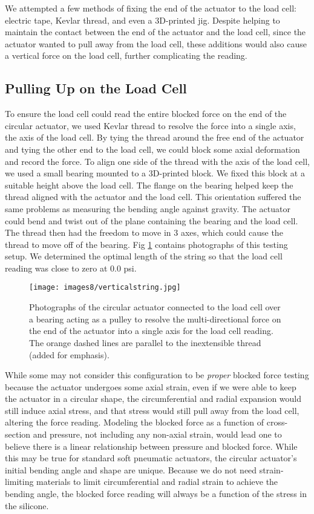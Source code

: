 We attempted a few methods of fixing the end of the actuator to the load cell: electric tape, Kevlar thread, and even a 3D-printed jig. Despite helping to maintain the contact between the end of the actuator and the load cell, since the actuator wanted to pull away from the load cell, these additions would also cause a vertical force on the load cell, further complicating the reading. 

\subsection{Pulling Up on the Load Cell}

To ensure the load cell could read the entire blocked force on the end of the circular actuator, we used Kevlar thread to resolve the force into a single axis, the axis of the load cell. By tying the thread around the free end of the actuator and tying the other end to the load cell, we could block some axial deformation and record the force. To align one side of the thread with the axis of the load cell, we used a small bearing mounted to a 3D-printed block. We fixed this block at a suitable height above the load cell. The flange on the bearing helped keep the thread aligned with the actuator and the load cell. This orientation suffered the same problems as measuring the bending angle against gravity. The actuator could bend and twist out of the plane containing the bearing and the load cell. The thread then had the freedom to move in 3 axes, which could cause the thread to move off of the bearing. Fig \ref{fig:verticalstring} contains photographs of this testing setup. We determined the optimal length of the string so that the load cell reading was close to zero at 0.0 psi. 

\begin{figure}[ht]
    \centering
     \texttt{[image: images8/verticalstring.jpg]}
    \caption{Photographs of the circular actuator connected to the load cell over a bearing acting as a pulley to resolve the multi-directional force on the end of the actuator into a single axis for the load cell reading. The orange dashed lines are parallel to the inextensible thread (added for emphasis).}
    \label{fig:verticalstring}
\end{figure}

While some may not consider this configuration to be \emph{proper} blocked force testing because the actuator undergoes some axial strain, even if we were able to keep the actuator in a circular shape, the circumferential and radial expansion would still induce axial stress, and that stress would still pull away from the load cell, altering the force reading. Modeling the blocked force as a function of cross-section and pressure, not including any non-axial strain, would lead one to believe there is a linear relationship between pressure and blocked force. While this may be true for standard soft pneumatic actuators, the circular actuator's initial bending angle and shape are unique. Because we do not need strain-limiting materials to limit circumferential and radial strain to achieve the bending angle, the blocked force reading will always be a function of the stress in the silicone. 

